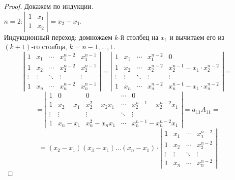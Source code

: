 \documentclass[12pt]{article}
\theoremstyle{definition} %
\theoremstyle{plain} %
\theoremstyle{remark} %
\begin{document}
{\begin{proof}
    Докажем по индукции. \\
    $n = 2: \left|\begin{array}{cc}
    1 & x_1 \\ 
    1 & x_2
    \end{array}\right| = x_2 - x_1$. \\
    Индукционный переход: домножаем $k$-й столбец на $x_1$ и вычитаем его из $(k + 1)$-го столбца, $k = n - 1, ..., 1$.
    \[\left|\begin{array}{ccccc}
    1 & x_1 & \cdots & x_1^{n - 2} & x_1^{n - 1} \\ 
    1 & x_2 & \cdots & x_2^{n - 2} & x_2^{n - 1} \\ 
    \vdots & \vdots & \ddots & \vdots & \vdots \\ 
    1 & x_n & \cdots & x_n^{n - 2} & x_n^{n - 1}
    \end{array}\right| = \left|\begin{array}{ccccc}
        1 & x_1 & \cdots & x_1^{n - 2} & 0 \\ 
        1 & x_2 & \cdots & x_2^{n - 2} & x_2^{n - 1} - x_1 \cdot x_2^{n - 2} \\ 
        \vdots & \vdots & \ddots & \vdots & \vdots \\ 
        1 & x_n & \cdots & x_n^{n - 2} & x_n^{n - 1} - x_1 \cdot x_n^{n - 2}
        \end{array}\right| =\]
        \[= \left|\begin{array}{ccccc}
        1 & 0 & 0 & \cdots & 0 \\ 
        1 & x_2 - x_1 & x_2^2 - x_2x_1 & \cdots & x_2^{n - 1} - x_2^{n - 2}x_1 \\ 
        \vdots & \vdots & \vdots & \ddots & \vdots \\ 
        1 & x_n - x_1 & x_n^2 - x_nx_1 & \cdots & x_n^{n - 1} - x_n^{n - 2}x_1
        \end{array}\right| = a_{11} A_{11} = \]
        \[ = (x_2 - x_1) (x_3 - x_1) ... (x_n - x_1) \cdot 
        \left|\begin{array}{cccc}
            1 & x_1 & \cdots & x_1^{n - 2} \\ 
            1 & x_2 & \cdots & x_2^{n - 2} \\ 
            \vdots & \vdots & \ddots & \vdots \\ 
            1 & x_n & \cdots & x_n^{n - 2}
            \end{array}\right|\]  
\end{proof}

}
\end{document}
